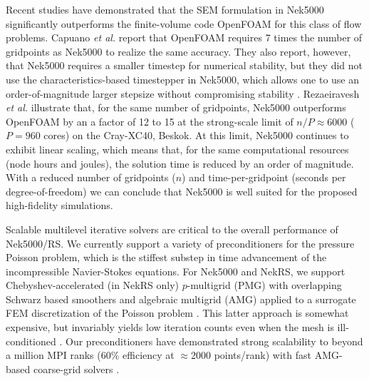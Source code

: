 Recent studies
have demonstrated that the SEM formulation in Nek5000 significantly outperforms
the finite-volume code OpenFOAM for this class of flow problems.  Capuano {\em
et al.} \cite{capuano19} report that OpenFOAM requires 7 times the number of
gridpoints as Nek5000 to realize the same accuracy.  They also report, however,
that Nek5000 requires a smaller timestep for numerical stability, but they did
not use the characteristics-based timestepper in Nek5000, which allows one to
use an order-of-magnitude larger stepsize without compromising stability
\cite{patel18}.  Rezaeiravesh {\em et al.} \cite{schlatter21} illustrate that,
for the same number of gridpoints, Nek5000 outperforms OpenFOAM by an a factor
of 12 to 15 at the strong-scale limit of $n/P \approx 6000$ ($P=960$ cores) on
the Cray-XC40, Beskok.  At this limit, Nek5000 continues to exhibit linear
scaling, which means that, for the same computational resources (node hours and
joules), the solution time is reduced by an order of magnitude.  With a reduced
number of gridpoints ($n$) and time-per-gridpoint (seconds per
degree-of-freedom) we can conclude that Nek5000 is well suited for the 
proposed high-fidelity simulations.

Scalable multilevel iterative solvers are critical to the overall performance
of Nek5000/RS.   We currently support a variety of preconditioners for the
pressure Poisson problem, which is the stiffest substep in time advancement of
the incompressible Navier-Stokes equations.  For Nek5000 and NekRS, we support
Chebyshev-accelerated (in NekRS only) $p$-multigrid (PMG) with overlapping
Schwarz based smoothers \cite{lottes05,nekrs} and algebraic multigrid (AMG)
applied to a surrogate FEM discretization of the Poisson problem
\cite{pedro19,sao80}.  This latter approach is somewhat expensive, but
invariably yields low iteration counts even when the mesh is ill-conditioned
\cite{fischer97}.  Our preconditioners have demonstrated strong scalability to
beyond a million MPI ranks (60\% efficiency at $\approx 2000$ points/rank) with
fast AMG-based coarse-grid solvers \cite{fischer15}.


